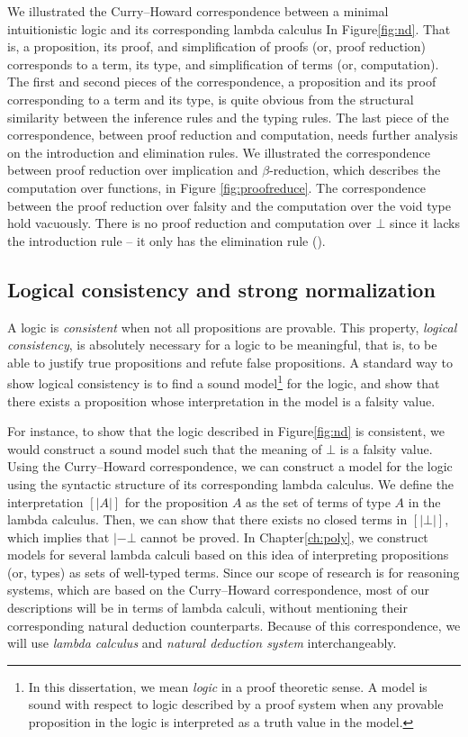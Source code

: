We illustrated the Curry--Howard correspondence between
a minimal intuitionistic logic and its corresponding lambda calculus
In Figure\;\ref{fig:nd}. That is, a proposition, its proof, and
simplification of proofs (or, proof reduction) corresponds to
a term, its type, and simplification of terms (or, computation).
The first and second pieces of the correspondence, a proposition and
its proof corresponding to a term and its type, is quite obvious from
the structural similarity between the inference rules and the typing rules.
The last piece of the correspondence, between proof reduction and computation,
needs further analysis on the introduction and elimination rules.
We illustrated the correspondence between proof reduction over implication
and $\beta$-reduction, which describes the computation over functions,
in Figure \ref{fig:proofreduce}. The correspondence between
the proof reduction over falsity and the computation over the void type
hold vacuously. There is no proof reduction and computation over $\bot$
since it lacks the introduction rule -- it only has the elimination rule
().

\subsection{Logical consistency and strong normalization}
A logic is \emph{consistent} when not all propositions are provable.
This property, \emph{logical consistency}, is absolutely necessary for
a logic to be meaningful, that is, to be able to justify true propositions
and refute false propositions. A standard way to show logical consistency
is to find a sound model\footnote{In this dissertation, we mean \emph{logic}
        in a proof theoretic sense. A model is sound with respect to logic
        described by a proof system when any provable proposition
        in the logic is interpreted as a truth value in the model.}
for the logic, and show that there exists a proposition
whose interpretation in the model is a falsity value.

For instance, to show that the logic described in Figure\;\ref{fig:nd}
is consistent, we would construct a sound model such that the meaning of
$\bot$ is a falsity value. Using the Curry--Howard correspondence,
we can construct a model for the logic using the syntactic structure of its
corresponding lambda calculus. We define the interpretation $[|A|]$ for
the proposition $A$ as the set of terms of type $A$ in the lambda calculus.
Then, we can show that there exists no closed terms in $[|\bot|]$,
which implies that $|- \bot$ cannot be proved. In Chapter\;\ref{ch:poly},
we construct models for several lambda calculi based on this idea of
interpreting propositions (or, types) as sets of well-typed terms.
Since our scope of research is for reasoning systems, which are based on
the Curry--Howard correspondence, most of our descriptions will be in terms of
lambda calculi, without mentioning their corresponding natural deduction
counterparts. Because of this correspondence, we will use \emph{lambda calculus}
and \emph{natural deduction system} interchangeably.

